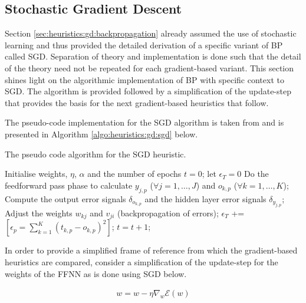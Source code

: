 \subsection{Stochastic Gradient Descent}
\label{sec:heuristics:gd:sgd}

Section \ref{sec:heuristics:gd:backpropagation} already assumed the use of stochastic learning and thus provided the detailed derivation of a specific variant of \ac{BP} called \acl{SGD}. Separation of theory and implementation is done such that the detail of the theory need not be repeated for each gradient-based variant. This section shines light on the algorithmic implementation of \ac{BP} with specific context to \ac{SGD}. The algorithm is provided followed by a simplification of the update-step that provides the basis for the next gradient-based heuristics that follow.

The pseudo-code implementation for the \ac{SGD} algorithm is taken from \cite{ref:engelbrecht:2007} and is presented in Algorithm \ref{algo:heuristics:gd:sgd} below.

\begin{algorithm}[H]
      \caption{The pseudo code algorithm for the \ac{SGD} heuristic.}
      \label{algo:heuristics:gd:sgd}
      \begin{algorithmic}
            \State Initialise weights, $\eta$, $\alpha$ and the number of epochs $t=0$;
            let $\epsilon_{T} = 0$
            \State Do the feedforward pass phase to calculate $y_{j,p}$ ($\forall j = 1, \dots, J$) and $o_{k,p}$ ($\forall k = 1, \dots, K$);
            \State Compute the output error signals $\delta_{o_{k,p}}$ and the hidden layer error signals $\delta_{y_{j,p}}$;
            \State Adjust the weights $w_{kj}$ and $v_{ji}$ (backpropagation of errors);
            \State $\epsilon_{T}$ += $[\epsilon_{p} = \sum^{K}_{k=1}(t_{k,p} - o_{k,p})^{2}]$;
            \EndFor
            \State $t = t + 1$;
            \EndWhile
      \end{algorithmic}
\end{algorithm}

In order to provide a simplified frame of reference from which the gradient-based heuristics are compared, consider a simplification of the update-step for the weights of the \ac{FFNN} as is done using \ac{SGD} below.

\begin{equation}
      \label{eq:heuristics:gd:sgd}
      \begin{split}
            w = w - \eta \nabla_{w}\mathcal{E}(w)
      \end{split}
\end{equation}


